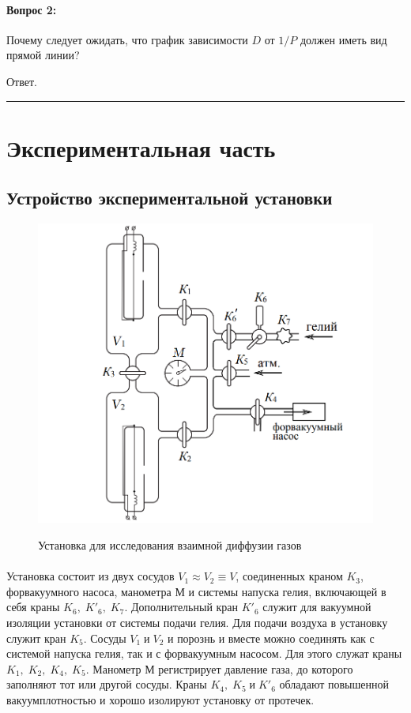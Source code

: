 \documentclass[a4paper,12pt]{article} %
\begin{document}
\paragraph{Вопрос 2:}
Почему следует ожидать, что график зависимости $D$ от $1/P$ должен иметь вид прямой линии?

Ответ.


\medskip\hrule\medskip

\section{Экспериментальная часть}

\subsection{Устройство экспериментальной установки}

\begin{figure}[h]
\begin{center}
\includegraphics[width=0.5\linewidth]{ustanovka_graph.png}
\label{ris:ustanovka_1} 
\caption{Установка для исследования взаимной диффузии газов}
\end{center}
\end{figure}
\paragraph{}
Установка состоит из двух сосудов $V_1 \approx V_2 \equiv V$, соединенных краном $K_3$, форвакуумного насоса, манометра М и системы напуска гелия, включающей в себя краны $K_6, \; K'_6,\; K_7$. Дополнительный кран $K'_6$ служит для вакуумной изоляции установки от системы подачи гелия. Для подачи воздуха в установку служит кран $K_5$. Сосуды $V_1 \; \text{и} \; V_2$ и порознь и вместе можно соединять как с системой напуска гелия, так и с форвакуумным насосом. Для этого служат краны $K_1,\; K_2,\; K_4,\; K_5$. Манометр М регистрирует давление газа, до которого заполняют тот или другой сосуды. Краны $K_4,\; K_5 \; \text{и} \; K'_6$ обладают повышенной вакуумплотностью и хорошо изолируют установку от протечек.
\end{document}
